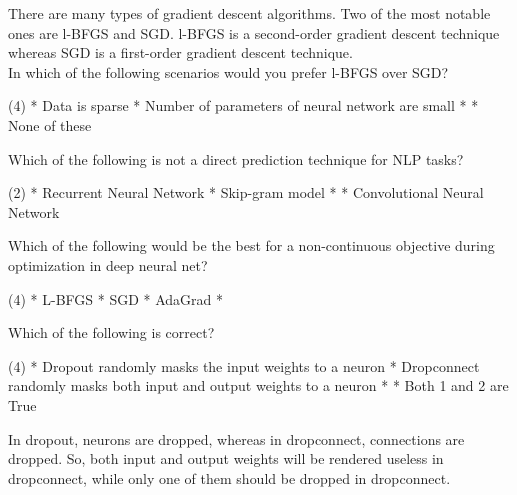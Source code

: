 \documentclass[10pt]{extarticle}
\begin{document}
\begin{exercise}
    There are many types of gradient descent algorithms. Two of the most notable ones are l-BFGS and SGD. l-BFGS is a second-order gradient descent technique whereas SGD is a first-order gradient descent technique.\\ In which of the following scenarios would you prefer l-BFGS over SGD?
    \begin{choice} (4)
        * Data is sparse
        * Number of parameters of neural network are small
        * 
        * None of these
    \end{choice}
\end{exercise}
\begin{solution}
\end{solution}

\begin{exercise}
    Which of the following is not a direct prediction technique for NLP tasks?
    \begin{choice} (2)
        * Recurrent Neural Network
        * Skip-gram model
        *
        * Convolutional Neural Network
    \end{choice}
\end{exercise}
\begin{solution}
\end{solution}

\begin{exercise}
    Which of the following would be the best for a non-continuous objective during optimization in deep neural net?
    \begin{choice} (4)
        * L-BFGS
        * SGD
        * AdaGrad
        *
    \end{choice}
\end{exercise}
\begin{solution}
\end{solution}

\begin{exercise}
    Which of the following is correct?
    \begin{choice} (4)
        * Dropout randomly masks the input weights to a neuron
        * Dropconnect randomly masks both input and output weights to a neuron
        *
        * Both 1 and 2 are True
    \end{choice}
\end{exercise}
\begin{solution}
    In dropout, neurons are dropped, whereas in dropconnect, connections are dropped. So, both input and output weights will be rendered useless in dropconnect, while only one of them should be dropped in dropconnect.
\end{solution}
\end{document}

